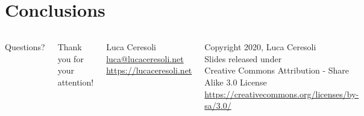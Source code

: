 \documentclass[xetex,table]{beamer}
\begin{document}
\section{Conclusions}

\begin{frame}
  \begin{columns}
    \center

    {\Huge Questions?}

    \center

    {\Large Thank you for your attention!}

    \vspace{0.15\textheight}

    {\Large Luca Ceresoli}\\
    \href{mailto:luca@lucaceresoli.net}{luca@lucaceresoli.net}\\
    \url{https://lucaceresoli.net}

    \vspace{0.05\textheight}

    \tiny
    \textcopyright{} Copyright 2020, Luca Ceresoli\\
    Slides released under\\
    Creative Commons Attribution - Share Alike 3.0 License \\
    \url{https://creativecommons.org/licenses/by-sa/3.0/} \\
\end{columns}
\end{frame}
\end{document}
